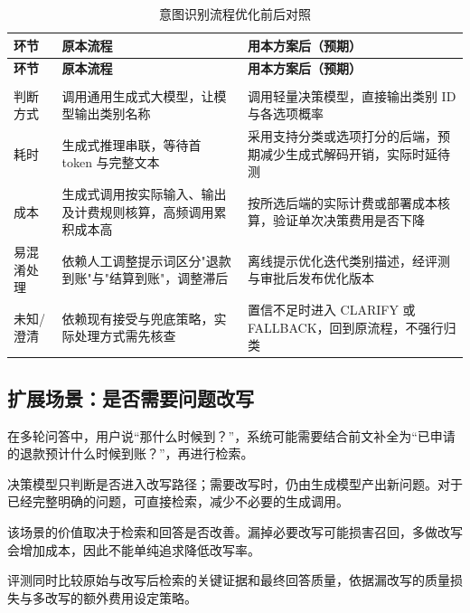 \documentclass[UTF8,a4paper,11pt,fontset=windows]{ctexart}
\begin{document}
{\small\setlength{\tabcolsep}{4pt}\renewcommand{\arraystretch}{1.28}
\begin{longtable}{>{\raggedright\arraybackslash}p{0.220\dimexpr\linewidth-6\tabcolsep\relax}>{\raggedright\arraybackslash}p{0.380\dimexpr\linewidth-6\tabcolsep\relax}>{\raggedright\arraybackslash}p{0.400\dimexpr\linewidth-6\tabcolsep\relax}}
\caption{意图识别流程优化前后对照}\label{tab:intent-flow}\\
\toprule
\textbf{环节} & \textbf{原本流程} & \textbf{用本方案后（预期）} \\
\midrule
\endfirsthead
\toprule
\textbf{环节} & \textbf{原本流程} & \textbf{用本方案后（预期）} \\
\midrule
\endhead
\midrule\multicolumn{3}{r}{\scriptsize\color{Muted}续下页}\\\endfoot
\bottomrule\endlastfoot
判断方式 & 调用通用生成式大模型，让模型输出类别名称 & 调用轻量决策模型，直接输出类别 ID 与各选项概率 \\
耗时 & 生成式推理串联，等待首 token 与完整文本 & 采用支持分类或选项打分的后端，预期减少生成式解码开销，实际时延待测 \\
成本 & 生成式调用按实际输入、输出及计费规则核算，高频调用累积成本高 & 按所选后端的实际计费或部署成本核算，验证单次决策费用是否下降 \\
易混淆处理 & 依赖人工调整提示词区分"退款到账"与"结算到账"，调整滞后 & 离线提示优化迭代类别描述，经评测与审批后发布优化版本 \\
未知/澄清 & 依赖现有接受与兜底策略，实际处理方式需先核查 & 置信不足时进入 CLARIFY 或 FALLBACK，回到原流程，不强行归类 \\
\end{longtable}}

\subsection{扩展场景：是否需要问题改写}

在多轮问答中，用户说“那什么时候到？”，系统可能需要结合前文补全为“已申请的退款预计什么时候到账？”，再进行检索。


决策模型只判断是否进入改写路径；需要改写时，仍由生成模型产出新问题。对于已经完整明确的问题，可直接检索，减少不必要的生成调用。


该场景的价值取决于检索和回答是否改善。漏掉必要改写可能损害召回，多做改写会增加成本，因此不能单纯追求降低改写率。


评测同时比较原始与改写后检索的关键证据和最终回答质量，依据漏改写的质量损失与多改写的额外费用设定策略。
\end{document}
